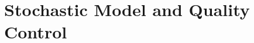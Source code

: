 \documentclass[main.tex]{subfiles}
\begin{document}
\section{Stochastic Model and Quality Control}\label{sec:stoch}

\newcommand{\zenvar}{\sigma^2_{\mathrm{zen}}}            %
\newcommand{\elev}{\theta}                               %
\newcommand{\sinel}{\sin\elev}                            %
\newcommand{\cnzero}{\mathrm{C/N_0}}                     %
\newcommand{\redmat}{\bm{\Theta}}                        %
\newcommand{\srmat}{\bm{Q}}                              %
\newcommand{\redno}{r}                                   %
\newcommand{\wtest}{w}                                   %
\newcommand{\mdb}{\mathrm{MDB}}                          %
\newcommand{\noncentral}{\delta_0}                       %
\newcommand{\varfac}{\hat{\sigma}^2_0}                   %
\newcommand{\wssr}{\Omega}                               %
\newcommand{\dof}{\mathrm{dof}}                          %
\newcommand{\residvec}{\hat{\bm{v}}}                     %
\end{document}
